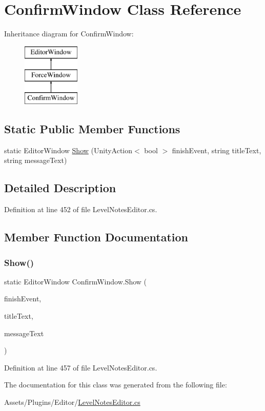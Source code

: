 \hypertarget{class_confirm_window}{}\section{Confirm\+Window Class Reference}
\label{class_confirm_window}
Inheritance diagram for Confirm\+Window\+:\begin{figure}[H]
\begin{center}
\leavevmode
\includegraphics[height=3.000000cm]{class_confirm_window}
\end{center}
\end{figure}
\subsection*{Static Public Member Functions}
\begin{DoxyCompactItemize}
\item 
static Editor\+Window \mbox{\hyperlink{class_confirm_window_a2fd2a577ef0069776de97bb92e033725}{Show}} (Unity\+Action$<$ bool $>$ finish\+Event, string title\+Text, string message\+Text)
\end{DoxyCompactItemize}


\subsection{Detailed Description}


Definition at line 452 of file Level\+Notes\+Editor.\+cs.



\subsection{Member Function Documentation}
\mbox{\label{class_confirm_window_a2fd2a577ef0069776de97bb92e033725}} 
\subsubsection{\texorpdfstring{Show()}{Show()}}
{\footnotesize\ttfamily static Editor\+Window Confirm\+Window.\+Show (\begin{DoxyParamCaption}\item[{Unity\+Action$<$ bool $>$}]{finish\+Event,  }\item[{string}]{title\+Text,  }\item[{string}]{message\+Text }\end{DoxyParamCaption})\hspace{0.3cm}{\ttfamily [static]}}



Definition at line 457 of file Level\+Notes\+Editor.\+cs.



The documentation for this class was generated from the following file\+:\begin{DoxyCompactItemize}
\item 
Assets/\+Plugins/\+Editor/\mbox{\hyperlink{_level_notes_editor_8cs}{Level\+Notes\+Editor.\+cs}}\end{DoxyCompactItemize}
